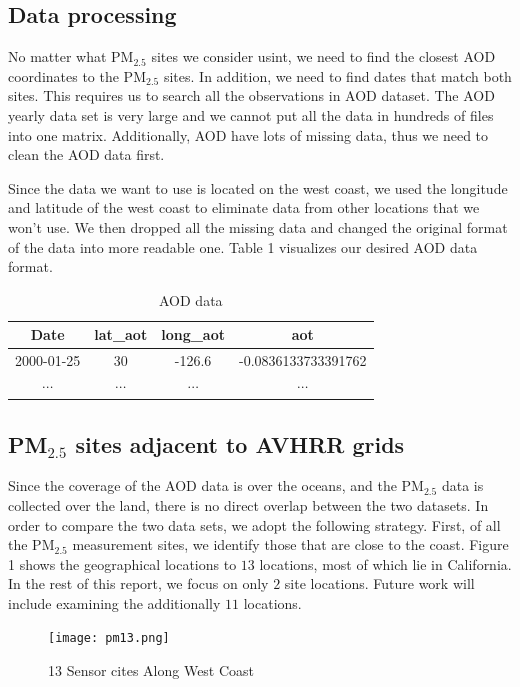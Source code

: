 \documentclass[10pt]{article}
\begin{document}
\subsection{Data processing}




No matter what PM$_{2.5}$ sites we consider usint, we need to find the closest AOD coordinates to the PM$_{2.5}$ sites. In addition, we need to find dates that match both sites. This requires us to search all the observations in AOD dataset. The AOD yearly data set is very large and we cannot put all the data in hundreds of files into one matrix. Additionally, AOD have lots of missing data, thus we need to clean the AOD data first. 

Since the data we want to use is located on the west coast,  we used the longitude and latitude of the west coast to eliminate data from other locations that we won\rq t use. We then dropped all the missing data and  changed the original format of the data into more readable one. Table 1 visualizes our desired AOD data format. 


\begin{table}[H]
\centering
\begin{tabular}{|c|c|c|c|}
\hline 
Date & lat\_aot & long\_aot & aot\\
\hline
2000-01-25 & 30 & -126.6 & -0.0836133733391762 \\
\hline
$\cdots$ & $\cdots$ & $\cdots$ & $\cdots$\\
\hline
\end{tabular}
\caption{AOD data}
\end{table}


\subsection{PM$_{2.5}$ sites adjacent to AVHRR grids}
Since the coverage of the AOD data is over the oceans, and the PM$_{2.5}$ data is collected over the land, there is no direct overlap between the two datasets. In order to compare the two data sets, we adopt the following strategy. First, of all the PM$_{2.5}$ measurement sites, we identify those that are close to the coast. Figure 1 shows the geographical locations to $13$ locations, most of which lie in California.   In the rest of this report, we focus on only $2$ site locations. Future work will include examining the additionally $11$ locations. 

\begin{figure}[H]
\centering
\texttt{[image: pm13.png]}
\caption{13 Sensor cites Along West Coast}
\end{figure}
\end{document}

